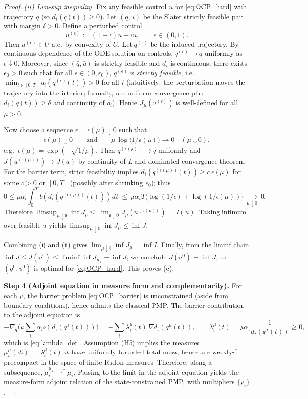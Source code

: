 \documentclass{article} %
\begin{document}
\begin{proof}
\emph{(ii) {Lim-sup} inequality.}
Fix any feasible control $u$ for \cref{eq:OCP_hard} with trajectory $q$ (so $d_i(q(t))\ge 0$).
Let $(\bar q,\bar u)$ be the Slater strictly feasible pair with margin $\delta>0$.
Define a perturbed control
\[
u^{(\epsilon)} := (1-\epsilon)u+\epsilon \bar u,\qquad \epsilon\in(0,1).
\]
Then $u^{(\epsilon)}\in U$ a.e.\ by convexity of $U$.
Let $q^{(\epsilon)}$ be the induced trajectory.
By continuous dependence of the ODE solution on controls, $q^{(\epsilon)}\to q$ uniformly as $\epsilon\downarrow 0$.
Moreover, since $(\bar q,\bar u)$ is strictly feasible and $d_i$ is continuous, there exists $\epsilon_0>0$ such that
for all $\epsilon\in(0,\epsilon_0)$, $q^{(\epsilon)}$ is \emph{strictly feasible}, i.e.\ $\min_{t\in[0,T]} d_i(q^{(\epsilon)}(t))>0$
for all $i$ (intuitively: the perturbation moves the trajectory into the interior; formally, use uniform convergence plus
$d_i(\bar q(t))\ge\delta$ and continuity of $d_i$).
Hence $J_\mu(u^{(\epsilon)})$ is well-defined for all $\mu>0$.

Now choose a sequence $\epsilon=\epsilon(\mu)\downarrow 0$ such that
\[
\epsilon(\mu)\downarrow 0
\qquad\text{and}\qquad
\mu\,\log\!\big(1/\epsilon(\mu)\big)\to 0\quad(\mu\downarrow 0),
\]
e.g.\ $\epsilon(\mu)=\exp(-\sqrt{1/\mu})$.
Then $q^{(\epsilon(\mu))}\to q$ uniformly and $J(u^{(\epsilon(\mu))})\to J(u)$ by continuity of $L$ and dominated convergence theorem.
For the barrier term, strict feasibility implies $d_i(q^{(\epsilon(\mu))}(t))\ge c\,\epsilon(\mu)$ for some $c>0$
on $[0,T]$ (possibly after shrinking $\epsilon_0$); thus
\[
0\le \mu\alpha_i\int_0^T b(d_i(q^{(\epsilon(\mu))}(t)))\,dt
\ \le\ \mu\alpha_i T\big(\log(1/c)+\log(1/\epsilon(\mu))\big)\ \xrightarrow[\mu\downarrow 0]{}\ 0.
\]
Therefore $\limsup_{\mu\downarrow 0}\inf J_\mu \le \lim_{\mu\downarrow 0} J_\mu(u^{(\epsilon(\mu))}) = J(u)$.
Taking infimum over feasible $u$ yields $\limsup_{\mu\downarrow 0}\inf J_\mu \le \inf J$.

Combining (i) and (ii) gives $\lim_{\mu\downarrow 0}\inf J_\mu = \inf J$.
Finally, from the liminf chain $\inf J \le J(u^0)\le \liminf \inf J_{\mu_k}=\inf J$, we conclude $J(u^0)=\inf J$,
so $(q^0,u^0)$ is optimal for \cref{eq:OCP_hard}. This proves (c).

\textbf{Step 4 {(Adjoint equation in measure form and complementarity)}.}
For each $\mu$, the barrier problem \cref{eq:OCP_barrier} is unconstrained (aside from boundary conditions), hence admits the classical PMP.
The barrier contribution to the adjoint equation is
\[
-\nabla_q\Big(\mu\sum_i \alpha_ib(d_i(q^\mu(t)))\Big)
= -\sum_i \lambda_i^\mu(t)\,\nabla d_i(q^\mu(t)),
\qquad
\lambda_i^\mu(t)=\mu\alpha_i\frac{1}{d_i(q^\mu(t))}\ge 0,
\]
which is \cref{eq:lambda_def}.
Assumption (H5) implies the measures $\mu_i^\mu(dt):=\lambda_i^\mu(t)\,dt$ have uniformly bounded total mass, hence are weakly-$^\ast$
precompact in the space of finite Radon measures. Therefore, along a subsequence, $\mu_i^{\mu_k}\rightharpoonup^\ast \mu_i$.
Passing to the limit in the adjoint equation yields the measure-form adjoint relation of the state-constrained PMP, with multipliers $\{\mu_i\}$.


\end{proof}
\end{document}
